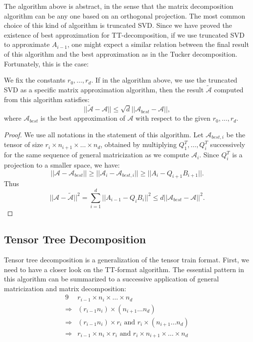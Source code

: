 \documentclass[12pt]{article}
\begin{document}
The algorithm above is abstract, in the sense that the matrix decomposition algorithm can be any one based on an orthogonal projection. The most common choice of this kind of algorithm is truncated SVD. Since we have proved the existence of best approximation for TT-decomposition, if we use truncated SVD to approximate $A_{i-1}$, one might expect a similar relation between the final result of this algorithm and  the best approximation as in the Tucker decomposition. Fortunately, this is the case:

\begin{mythm}
We fix the constants $r_0, \dots, r_d$. If in the algorithm above, we use the truncated SVD as a specific matrix approximation algorithm, then the result $\tilde{\mathcal{A}}$ computed from this algorithm satisfies:
$$ || \tilde{\mathcal{A}} - \mathcal{A} || \leq \sqrt{d} || \mathcal{A}_{best} - \mathcal{A} ||,$$
where $\mathcal{A}_{best}$ is the best approximation of $\mathcal{A}$ with respect to the given $r_0, \dots, r_d$.
\end{mythm}

\begin{proof}
We use all notations in the statement of this algorithm. Let $\mathcal{A}_{best, i}$ be the tensor of size $r_i \times n_{i+1} \times \dots \times n_d$, obtained by multiplying $Q_1^T, \dots, Q_i^T$ successively for the same sequence of general matricization as we compute $\mathcal{A}_i$. Since $Q_i^T$ is a projection to a smaller space, we have:
$$ || \mathcal{A} - \mathcal{A}_{best} || \geq || \mathcal{A}_i - \mathcal{A}_{best, i} || \geq || A_i - Q_{i+1}B_{i+1} ||. $$
Thus 
$$ || \mathcal{A} - \tilde{\mathcal{A}} || ^ 2 = \sum_{i=1}^d || A_{i-1} - Q_iB_i || ^ 2 \leq d || \mathcal{A}_{best} - \mathcal{A} || ^ 2. $$
\end{proof}

\subsection{Tensor Tree Decomposition}
Tensor tree decomposition is a generalization of the tensor train format. First, we need to have a closer look on the TT-format algorithm. The essential pattern in this algorithm can be summarized to a successive application of general matricization and matrix decomposition:
\begin{alignat*}{9}
& r_{i-1} \times n_i \times \dots \times n_d \\
\Rightarrow & (r_{i-1}n_i) \times (n_{i+1} \dots n_d) \\
\Rightarrow & (r_{i-1}n_i) \times r_i \text{ and } r_i \times  (n_{i+1} \dots n_d) \\
\Rightarrow & r_{i-1} \times n_i \times r_i \text{ and } r_i \times n_{i+1} \times \dots \times n_d
\end{alignat*}
\end{document}
